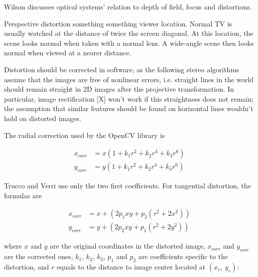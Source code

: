Wilson \cite{wilson2004anton} discusses optical systems' relation to depth of field, focus and distortions.

Perspective distortion something something viewer location. Normal TV is usually watched at the distance of twice the screen diagonal. At this location, the scene looks normal when taken with a normal lens. A wide-angle scene then looks normal when viewed at a nearer distance. \cite{wilson2004anton}




Distortion should be corrected in software, as the following stereo algorithms assume that the images are free of nonlinear errors, i.e. straight lines in the world should remain straight in 2D images after the projective transformation.
In particular, image rectification [X] won't work if this straightness does not remain; the assumption that similar features should be found on horizontal lines wouldn't hold on distorted images.

The radial correction used by the OpenCV library is

\begin{align}
	x_{corr} &= x(1 + k_1 r^2 + k_2 r^4 + k_3 r^6)\\
	y_{corr} &= y(1 + k_1 r^2 + k_2 r^4 + k_3 r^6)
\end{align}

Trucco and Verri \cite{trucco1998introductory} use only the two first coefficients. For tangential distortion, the formulas are

\begin{align}
x_{corr} &= x + (2 p_1 x y + p_2 (r^2 + 2 x^2))\\
y_{corr} &= y + (2 p_2 x y + p_1 (r^2 + 2 y^2))
\end{align}

where $x$ and $y$ are the original coordinates in the distorted image, $x_{corr}$ and $y_{corr}$ are the corrected ones, $k_1$, $k_2$, $k_3$, $p_1$ and $p_2$ are coefficients specific to the distortion, and $r$ equals to the distance to image center located at $(x_c,~y_c)$:

